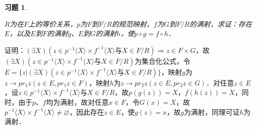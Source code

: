 \documentclass[12pt, a4paper, oneside]{book}
\newtheorem{exer}{习题}
\begin{document}
			\begin{exer}\label{exer74}
				\hfill\par
				$R$为在$F$上的等价关系，$p$为$F$到$F/R$的规范映射，$f$为$G$到$F/R$的满射，求证：存在$E$，以及$E$到$F$的满射$g$、$E$到$G$的满射$h$，使$p\circ g=f\circ h$．
			\end{exer}
			证明：$(\exists X)(z\in p^{-1}\langle X \rangle \times f^{-1}\langle X \rangle \text{与}X\in F/R)\Rightarrow z\in F\times G$，故$(\exists X)(z\in p^{-1}\langle X \rangle \times f^{-1}\langle X \rangle \text{与}X\in F/R)$为集合化公式，令$E=\{z|(\exists X)(z\in p^{-1}\langle X \rangle \times f^{-1}\langle X \rangle \text{与}X\in F/R)\}$，映射$g$为$z\to pr_1z(z\in E, pr_1z\in F)$，映射$h$为$z\to pr_2z(z\in E, pr_2z\in G)$．对任意$z\in E$，设$z\in p^{-1}\langle X \rangle \times f^{-1}\langle X \rangle \text{与}X\in F/R$，故$p(g(z))=X$，$f(h(z))=X$，同时，由于$p$、$f$均为满射，故对任意$x\in F$，令$G(x)=X$，故$p^{-1}\langle X \rangle \times f^{-1}\langle X \rangle \neq \varnothing$，因此存在$z\in E$，使$g(z)=x$，故$g$为满射，同理可证$h$为满射．			
			
\end{document}
